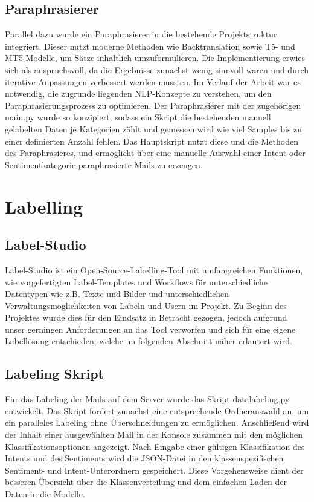 \subsection{Paraphrasierer}
Parallel dazu wurde ein Paraphrasierer in die bestehende Projektstruktur integriert. Dieser nutzt
moderne Methoden wie Backtranslation sowie T5- und MT5-Modelle, um Sätze inhaltlich
umzuformulieren. Die Implementierung erwies sich als anspruchsvoll, da die Ergebnisse zunächst
wenig sinnvoll waren und durch iterative Anpassungen verbessert werden mussten. Im Verlauf der
Arbeit war es notwendig, die zugrunde liegenden NLP-Konzepte zu verstehen, um den
Paraphrasierungsprozess zu optimieren. Der Paraphrasierer mit der zugehörigen main.py wurde
so konzipiert, sodass ein Skript die bestehenden manuell gelabelten Daten je Kategorien
zählt und gemessen wird wie viel Samples bis zu einer definierten Anzahl fehlen.
Das Hauptskript nutzt diese und die Methoden des Paraphrasieres, und ermöglicht
über eine manuelle Auswahl einer Intent oder Sentimentkategorie paraphrasierte Mails zu erzeugen. 

\section{Labelling}

\subsection{Label-Studio}
Label-Studio ist ein Open-Source-Labelling-Tool mit umfangreichen Funktionen,
wie vorgefertigten Label-Templates und Workflows für unterschiedliche Datentypen
wie z.B. Texte und Bilder und unterschiedlichen Verwaltungsmöglichkeiten von Labeln
und Usern im Projekt. Zu Beginn des Projektes wurde dies für den Eindsatz in Betracht
gezogen, jedoch aufgrund unser gerningen Anforderungen an das Tool  verworfen und sich für
eine eigene Labellösung entschieden, welche im folgenden Abschnitt näher erläutert wird.  

\subsection{Labeling Skript}
Für das Labeling der Mails auf dem Server wurde das Skript data\textunderscore labeling.py
entwickelt. Das Skript fordert zunächst eine entsprechende Ordnerauswahl an, um ein
paralleles Labeling ohne Überschneidungen zu ermöglichen. Anschließend wird der Inhalt einer
ausgewählten Mail in der Konsole zusammen mit den möglichen Klassifikationsoptionen
angezeigt. Nach Eingabe einer gültigen Klassifikation des Intents und des Sentiments
wird die JSON-Datei in den klassenspezifischen Sentiment- und Intent-Unterordnern
gespeichert. Diese Vorgehensweise dient der besseren Übersicht über die Klassenverteilung
und dem einfachen Laden der Daten in die Modelle. 

